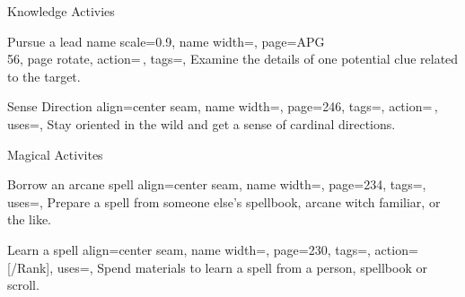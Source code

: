 \begin{PageFront}
\begin{Tables}{\frontTableHeight}
\begin{Table}{Knowledge Activies}
            \breakLine
            \begin{entry}{Pursue a lead}{%
                name scale=0.9,
                name width=\activityLength,%
                page={APG\\\vspace{-0.4ex}56},
                page rotate,
                action=\,,
                tags=\Concentrate\Investigator,
            }
                Examine the details of one potential clue related to the target.
            \end{entry}
            \begin{entry}{Sense Direction}{%
                align=center seam,
                name width=\activityLength,%
                page=246,
                tags=\Concentrate,
                action=\,,
                uses={\Survival[tags=S]},
            }
                Stay oriented in the wild and get a sense of cardinal directions. \hfill{}\\
                \hfill{}
            \end{entry}
        \end{Table}
        \TableSpace
        \begin{Table}{Magical Activites}
            \begin{entry}{Borrow an arcane spell}{%
                align=center seam,
                name width=\activityLength,%
                page=234,
                tags=\Concentrate,
                uses={\Arcana[tags=T]},
            }
                Prepare a spell from someone else's spellbook, arcane witch familiar, or the like. \\ \hfill {}
            \end{entry}
            \begin{entry}{Learn a spell}{%
                align=center seam,
                name width=\activityLength,%
                page=230,
                tags=\Concentrate,
                action=\,[/Rank],
                uses={\MagicalSkill[tags=T]},
            }
                Spend materials to learn a spell from a person, spellbook or scroll. \hfill{}\\
                \hphantom{t}\hfill{}\quad{}

\end{entry}
\end{Table}
\end{Tables}
\end{PageFront}
